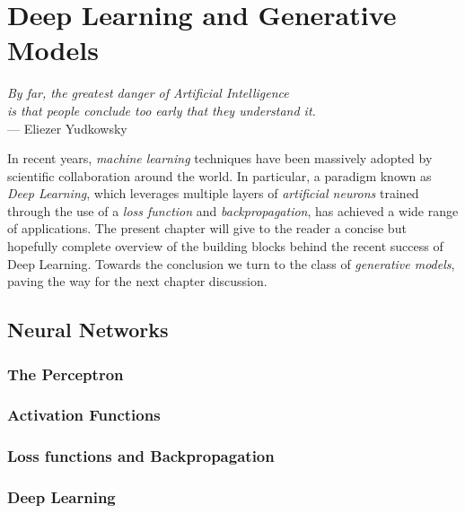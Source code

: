 \chapter{Deep Learning and Generative Models}\label{ch:dlgm}
\begin{flushright}{\slshape
        By far, the greatest danger of Artificial Intelligence \\
        is that people conclude too early that they understand it.} \\ \medskip
    --- Eliezer Yudkowsky
\end{flushright}

In recent years, \emph{machine learning} techniques have been massively adopted by scientific collaboration around the world. In particular, a paradigm known as \emph{Deep Learning}, which leverages multiple layers of \emph{artificial neurons} trained through the use of a \emph{loss function} and \emph{backpropagation}, has achieved a wide range of applications.
The present chapter will give to the reader a concise but hopefully complete overview of the building blocks behind the recent success of Deep Learning. Towards the conclusion we turn to the class of \emph{generative models}, paving the way for the next chapter discussion.
	

\section{Neural Networks}


\subsection{The Perceptron}


\subsection{Activation Functions}

\subsection{Loss functions and Backpropagation}

\subsection{Deep Learning}

